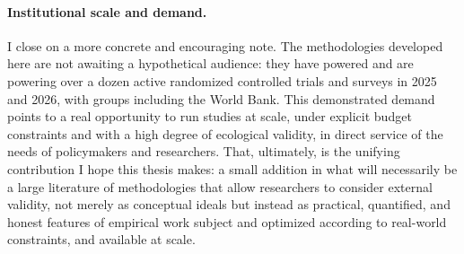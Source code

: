 \paragraph{Institutional scale and demand.} I close on a more concrete and encouraging note. The methodologies developed here are not awaiting a hypothetical audience: they have powered and are powering over a dozen active randomized controlled trials and surveys in 2025 and 2026, with groups including the World Bank. This demonstrated demand points to a real opportunity to run studies at scale, under explicit budget constraints and with a high degree of ecological validity, in direct service of the needs of policymakers and researchers. That, ultimately, is the unifying contribution I hope this thesis makes: a small addition in what will necessarily be a large literature of methodologies that allow researchers to consider external validity, not merely as conceptual ideals but instead as practical, quantified, and honest features of empirical work subject and optimized according to real-world constraints, and available at scale. 


\printbibliography[heading=subbibliography, title={References for Chapter \thechapter}]
